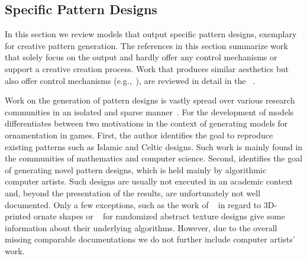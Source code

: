 

\subsection{Specific Pattern Designs}
\label{subsec:specific_pattern_designs}

In this section we review models that output specific pattern designs, exemplary for creative pattern generation. The references in this section summarize work that solely focus on the output and hardly offer any control mechanisms or support a creative creation process. Work that produces similar aesthetics but also offer control mechanisms (e.g.,~\cite{wong_1998_cgf,yu_2012_ans,zehnder_2016_dso}), are reviewed in detail in the ~.


Work on the generation of pattern designs is vastly spread over various research communities in an isolated and sparse manner~\cite{whitehead_2010_tpd}. For the development of models \citeauthor*{whitehead_2010_tpd}~\cite{whitehead_2010_tpd} differentiates between two motivations in the context of generating models for ornamentation in games. First, the author identifies the goal to reproduce existing patterns such as Islamic and Celtic designs. Such work is mainly found in the communities of mathematics and computer science. Second, \citeauthor*{whitehead_2010_tpd} identifies the goal of generating novel pattern designs, which is held mainly by algorithmic computer artists. Such designs are usually not executed in an academic context and, beyond the presentation of the results, are unfortunately not well documented. Only a few exceptions, such as the work of \citeauthor*{takayama_2016_med}~\cite{takayama_2016_med} in regard to 3D-printed ornate shapes or \citeauthor*{alvarez_2019_ido}~\cite{alvarez_2019_ido} for randomized abstract texture designs give some information about their underlying algorithms. However, due to the overall missing comparable documentations we do not further include computer artists' work.

